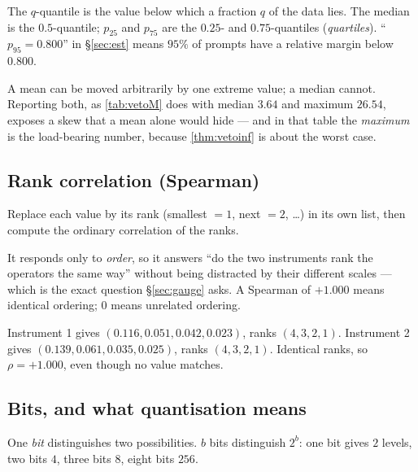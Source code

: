 \begin{definition}[Quantile]
The $q$-quantile is the value below which a fraction $q$ of the data lies. The
median is the $0.5$-quantile; $p_{25}$ and $p_{75}$ are the $0.25$- and
$0.75$-quantiles (\emph{quartiles}). ``$p_{95}=0.800$'' in §\ref{sec:est} means
$95\%$ of prompts have a relative margin below $0.800$.
\end{definition}

\begin{remark}
A mean can be moved arbitrarily by one extreme value; a median cannot. Reporting
both, as \cref{tab:vetoM} does with median $3.64$ and maximum $26.54$, exposes a
skew that a mean alone would hide --- and in that table the \emph{maximum} is the
load-bearing number, because \cref{thm:vetoinf} is about the worst case.
\end{remark}

\subsection{Rank correlation (Spearman)}

\begin{definition}
Replace each value by its rank (smallest $=1$, next $=2$, \dots) in its own list,
then compute the ordinary correlation of the ranks.
\end{definition}

 It responds only to \emph{order},
so it answers ``do the two instruments rank the operators the same way'' without
being distracted by their different scales --- which is the exact question
§\ref{sec:gauge} asks. A Spearman of $+1.000$ means identical ordering; $0$ means
unrelated ordering.

 Instrument 1 gives $(0.116, 0.051, 0.042, 0.023)$, ranks
$(4,3,2,1)$. Instrument 2 gives $(0.139,0.061,0.035,0.025)$, ranks $(4,3,2,1)$.
Identical ranks, so $\rho=+1.000$, even though no value matches.

\subsection{Bits, and what quantisation means}

\begin{definition}[Bit]
One \emph{bit} distinguishes two possibilities. $b$ bits distinguish $2^b$: one
bit gives $2$ levels, two bits $4$, three bits $8$, eight bits $256$.
\end{definition}

